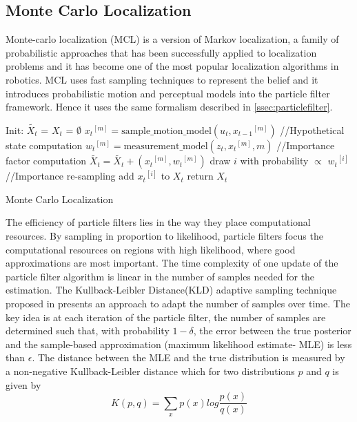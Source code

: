{\subsection{Monte Carlo Localization}
\label{ssec:montecarlo}
	Monte-carlo localization (MCL)\cite{Fox99montecarlo} is a version of Markov localization, a family of probabilistic approaches that has been successfully applied to localization problems and it has become one of the most popular localization algorithms in robotics. MCL uses fast sampling techniques to represent the belief and it introduces probabilistic motion and perceptual models into the particle filter framework. Hence it uses the same formalism described in \ref{ssec:particlefilter}.\\  	
\begin{algorithm}
Init: {$\tilde{X_t}$ = $X_t$ = $\emptyset$ } \;
  { 
   ${x_t}^{[m]} = \text{sample\_motion\_model}(u_t,{x_{t-1}}^{[m]})$ //Hypothetical state computation\;
   ${w_t}^{[m]} = \text{measurement\_model}(z_t,{x_t}^{[m]},m)$ //Importance factor computation \; 
   $\tilde{X_t} = \tilde{X_t} + ({x_t}^{[m]},{w_t}^{[m]})$ \;
 }
  { 
   draw $i$ with probability $\varpropto$ ${w_t}^{[i]}$ //Importance re-sampling\;
   add ${x_t}^{[i]}$ to $X_t$ \;
 }
 return $X_t$
 \caption{Monte Carlo Localization}
 \label{alg:montecarlo}
\end{algorithm}

	The efficiency of particle filters lies in the way they place computational resources. By sampling in proportion to likelihood, particle filters focus the computational resources on regions with high likelihood, where good approximations are most important. The time complexity of one update of the particle filter algorithm is linear in the number of samples needed for the estimation. The Kullback-Leibler Distance(KLD) adaptive sampling technique proposed in \cite{Fox03adaptingthe} presents an approach to adapt the number of samples over time. The key idea is at each iteration of the particle filter, the number of samples are determined such that, with probability $1-\delta$, the error between the true posterior and the sample-based approximation (maximum likelihood estimate- MLE) is less than $\epsilon$. The distance between the MLE and the true distribution is measured by a non-negative Kullback-Leibler distance which for two distributions $p$ and $q$ is given by
\begin{equation}
K(p,q) = \sum_{x} p(x)log{\frac{p(x)}{q(x)}}
\end{equation}

}
